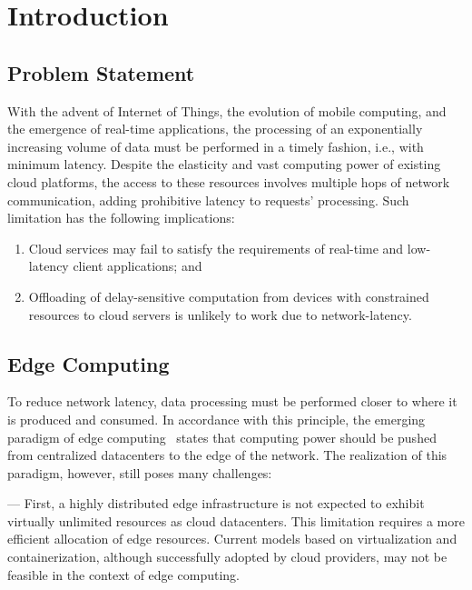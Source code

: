\section{Introduction}

\subsection*{Problem Statement}

With the advent of Internet of Things, the evolution of mobile computing, and the emergence of real-time applications, the processing of an exponentially increasing volume of data must be performed in a timely fashion, i.e., with minimum latency. Despite the elasticity and vast computing power of existing cloud platforms, the access to these resources involves multiple hops of network communication, adding prohibitive latency to requests' processing. Such limitation has the following implications:

\begin{enumerate}

\item Cloud services may fail to satisfy the requirements of real-time and low-latency client applications; and

\item Offloading of delay-sensitive computation from devices with constrained resources to cloud servers is unlikely to work due to network-latency.

\end{enumerate}

\subsection*{Edge Computing}

To reduce network latency, data processing must be performed closer to where it is produced and consumed. In accordance with this principle, the emerging paradigm of edge computing~\cite{} states that computing power should be pushed from centralized datacenters to the edge of the network. The realization of this paradigm, however, still poses many challenges:


--- First, a highly distributed edge infrastructure is not expected to exhibit virtually unlimited resources as cloud datacenters. This limitation requires a more efficient allocation of edge resources. Current models based on virtualization and containerization, although successfully adopted by cloud providers, may not be feasible in the context of edge computing.

